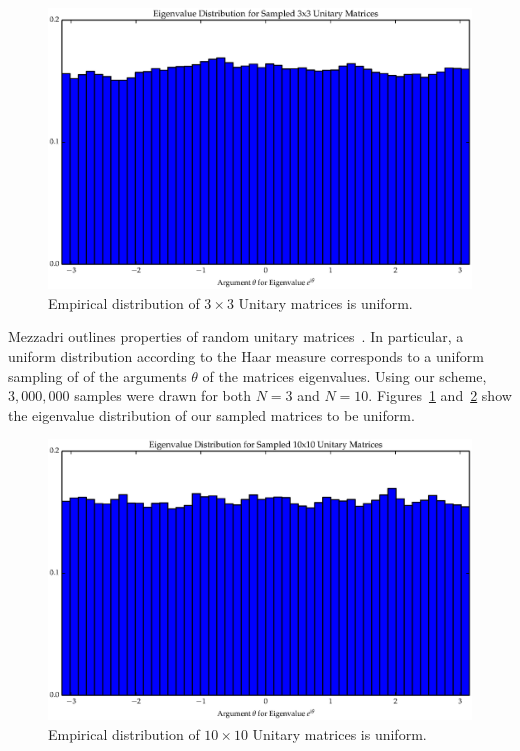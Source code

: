 \begin{figure}[ht]
\centering
  \includegraphics[scale=0.6, angle=0]{images/unitary_3_hist.eps}
\caption{Empirical distribution of $3\times 3$ Unitary matrices is uniform.}
\label{fig:Uny3}
\end{figure}
Mezzadri outlines properties of random unitary matrices~\cite{Mezzadri2007}. In particular, a uniform distribution according to the Haar measure corresponds to a uniform sampling of of the arguments $\theta$ of the matrices eigenvalues. Using our scheme, $3,000,000$ samples were drawn for both $N = 3$ and $N = 10$. Figures~\ref{fig:Uny3} and~\ref{fig:Uny10} show the eigenvalue distribution of our sampled matrices to be uniform.  
\begin{figure}[ht]
\centering
  \includegraphics[scale=0.6, angle=0]{images/unitary_10_hist.eps}
\caption{Empirical distribution of $10\times 10$ Unitary matrices is uniform.}
\label{fig:Uny10}
\end{figure}

